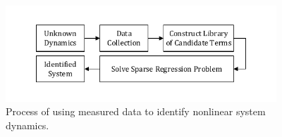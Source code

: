 \documentclass[letterpaper, preprint, paper,11pt]{AAS}	%
\begin{document}
\begin{figure}[h!]
	\centering\includegraphics[width=4.0in]{Figures/SINDYC.pdf}
	\caption{Process of using measured data to identify nonlinear system dynamics.}
	\label{fig:SINCYC}
\end{figure}

\end{document}
